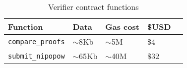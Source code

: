 \begin{table}[ht]
  \centering
  \caption{Verifier contract functions}
  \label{tbl:gascosts}
  \begin{tabular}{l|l|l|ll}
    \hline
    Function & Data & Gas cost & \$USD \\ \hline
    \texttt{compare\_proofs} & $\sim$8Kb & $\sim$5M & \$4 \\ \hline
    \texttt{submit\_nipopow} & $\sim$65Kb & $\sim$40M & \$32 \\ \hline
  \end{tabular}
\end{table}

